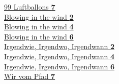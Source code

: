 \toctitle{\faHashtag} 
\hyperlink{page.7}{99 Luftballons \textbf {7}} \\ 
\hyperlink{page.2}{Blowing in the wind \textbf {2}} \\ 
\hyperlink{page.4}{Blowing in the wind \textbf {4}} \\ 
\hyperlink{page.6}{Blowing in the wind \textbf {6}} \\ 
\hyperlink{page.2}{Irgendwie, Irgendwo, Irgendwann \textbf {2}} \\ 
\hyperlink{page.4}{Irgendwie, Irgendwo, Irgendwann \textbf {4}} \\ 
\hyperlink{page.6}{Irgendwie, Irgendwo, Irgendwann \textbf {6}} \\ 
\hyperlink{page.7}{Wir vom Pfad \textbf {7}} \\ 
